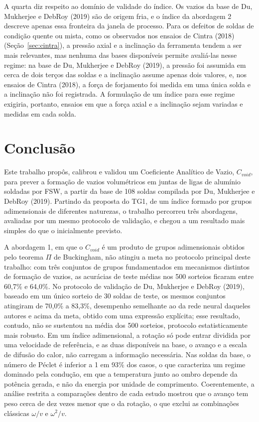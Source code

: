 \documentclass[12pt,openany]{report}
\begin{document}
A quarta diz respeito ao domínio de validade do índice. Os vazios da base de Du, Mukherjee e DebRoy (2019) são de origem fria, e o índice da abordagem 2 descreve apenas essa fronteira da janela de processo. Para os defeitos de soldas de condição quente ou mista, como os observados nos ensaios de Cintra (2018) (Seção~\ref{sec:cintra}), a pressão axial e a inclinação da ferramenta tendem a ser mais relevantes, mas nenhuma das bases disponíveis permite avaliá-las nesse regime: na base de Du, Mukherjee e DebRoy (2019), a pressão foi assumida em cerca de dois terços das soldas e a inclinação assume apenas dois valores, e, nos ensaios de Cintra (2018), a força de forjamento foi medida em uma única solda e a inclinação não foi registrada. A formulação de um índice para esse regime exigiria, portanto, ensaios em que a força axial e a inclinação sejam variadas e medidas em cada solda.

\chapter{Conclusão}
\label{cap:conclusao}

Este trabalho propôs, calibrou e validou um Coeficiente Analítico de Vazio, $C_{void}$, para prever a formação de vazios volumétricos em juntas de ligas de alumínio soldadas por FSW, a partir da base de 108 soldas compilada por Du, Mukherjee e DebRoy (2019). Partindo da proposta do TG1, de um índice formado por grupos adimensionais de diferentes naturezas, o trabalho percorreu três abordagens, avaliadas por um mesmo protocolo de validação, e chegou a um resultado mais simples do que o inicialmente previsto.

A abordagem 1, em que o $C_{void}$ é um produto de grupos adimensionais obtidos pelo teorema $\Pi$ de Buckingham, não atingiu a meta no protocolo principal deste trabalho: com três conjuntos de grupos fundamentados em mecanismos distintos de formação de vazios, as acurácias de teste médias nos 500 sorteios ficaram entre 60,7\% e 64,0\%. No protocolo de validação de Du, Mukherjee e DebRoy (2019), baseado em um único sorteio de 30 soldas de teste, os mesmos conjuntos atingiram de 70,0\% a 83,3\%, desempenho semelhante ao da rede neural daqueles autores e acima da meta, obtido com uma expressão explícita; esse resultado, contudo, não se sustentou na média dos 500 sorteios, protocolo estatisticamente mais robusto. Em um índice adimensional, a rotação só pode entrar dividida por uma velocidade de referência, e as duas disponíveis na base, o avanço e a escala de difusão do calor, não carregam a informação necessária. Nas soldas da base, o número de Péclet é inferior a 1 em 93\% dos casos, o que caracteriza um regime dominado pela condução, em que a temperatura junto ao ombro depende da potência gerada, e não da energia por unidade de comprimento. Coerentemente, a análise restrita a comparações dentro de cada estudo mostrou que o avanço tem peso cerca de dez vezes menor que o da rotação, o que exclui as combinações clássicas $\omega/v$ e $\omega^{2}/v$.
\end{document}
